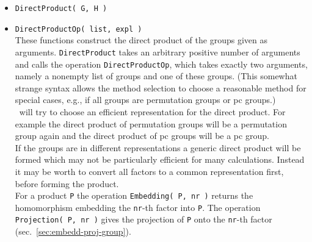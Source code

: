 \begin{itemize}
\item {\tt DirectProduct( G, H )}
\item {\tt DirectProductOp( list, expl )}\\[2pt] 
These functions construct the direct product of the groups given as arguments. 
{\tt DirectProduct} takes an arbitrary positive number of arguments and calls the
operation {\tt DirectProductOp}, which takes exactly two arguments, namely a nonempty
list of groups and one of these groups. (This somewhat strange syntax allows the
method selection to choose a reasonable method for special cases, e.g., if all groups
are permutation groups or pc groups.)
\\[5pt]
\gap\ will try to choose an efficient representation for the direct product. For example the direct product
of permutation groups will be a permutation group again and the direct product of pc groups will be a pc
group.
\\[5pt]
If the groups are in different representations a generic direct product will be formed which may not be
particularly efficient for many calculations. Instead it may be worth to convert all factors to a common
representation first, before forming the product.
\\[5pt]
For a product {\tt P} the operation {\tt Embedding( P, nr )} returns the
homomorphism embedding the {\tt nr}-th factor into {\tt P}. The operation
{\tt Projection( P, nr )} gives the projection of {\tt P} onto the {\tt nr}-th factor
(sec.~\ref{sec:embedd-proj-group}).
\end{itemize}
\subsectionspace

